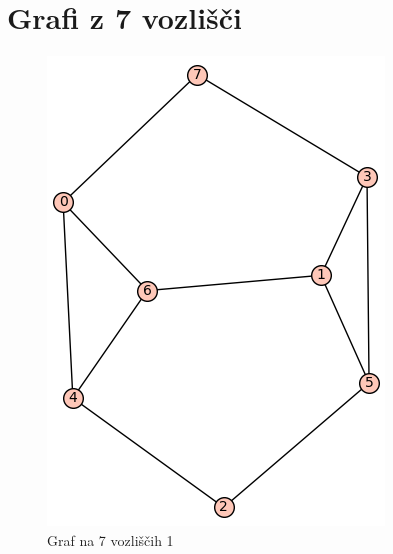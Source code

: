 \documentclass[11pt,a4paper,titlepage]{article}
\begin{document}
\section{Grafi z 7 vozlišči}

\begin{figure}[H]
	\centering
	\begin{minipage}{0.45\textwidth}
		\centering
		\includegraphics[width=\linewidth]{orig_7_1.png}
		\caption{Graf na 7 vozliščih 1}
	\end{minipage}
	\hfill
	\begin{minipage}{0.45\textwidth}
		\centering

\end{minipage}
\end{figure}
\end{document}
